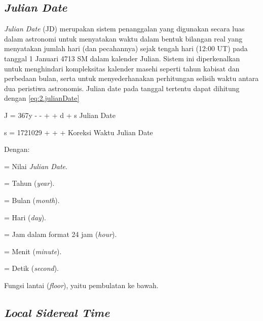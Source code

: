 \subsection{\textit{Julian Date}} \label{II.Teori3}
\textit{Julian Date} (JD) merupakan sistem penanggalan yang digunakan secara luas dalam astronomi untuk menyatakan waktu dalam bentuk bilangan real yang menyatakan jumlah hari (dan pecahannya) sejak tengah hari (12:00 UT) pada tanggal 1 Januari 4713 SM dalam kalender Julian. Sistem ini diperkenalkan untuk menghindari kompleksitas kalender masehi seperti tahun kabisat dan perbedaan bulan, serta untuk menyederhanakan perhitungan selisih waktu antara dua peristiwa astronomis\cite{HannuKarttunen2017}. Julian date pada tanggal tertentu dapat dihitung dengan \ref{eq:2.julianDate} \cite{HannuKarttunen2017}
\begin{equationcaptioned}[eq:2.julianDate]{
		J = 367y - \left\lfloor {} \right\rfloor - \left\lfloor {} \right\rfloor + \left\lfloor {} \right\rfloor + d + s	
	}{
		Julian Date
	}
\end{equationcaptioned}
\begin{equationcaptioned}[eq:2.julianDateKoreksi]{
		s = 1721029 +  +  + 	
	}{
		Koreksi Waktu Julian Date
	}
\end{equationcaptioned}

Dengan:
\begin{description}[noitemsep]
	\item[$J$] = Nilai \textit{Julian Date}.
	\item[$y$] = Tahun (\textit{year}).
	\item[$m$] = Bulan (\textit{month}).
	\item[$d$] = Hari (\textit{day}).
	\item[$h$] = Jam dalam format 24 jam (\textit{hour}).
	\item[$M$] = Menit (\textit{minute}).
	\item[$s$] = Detik (\textit{second}).
	\item[$\lfloor \cdot \rfloor$] Fungsi lantai (\textit{floor}), yaitu pembulatan ke bawah.
\end{description}

\subsection{\textit{Local Sidereal Time}} \label{II.TeoriLST}

